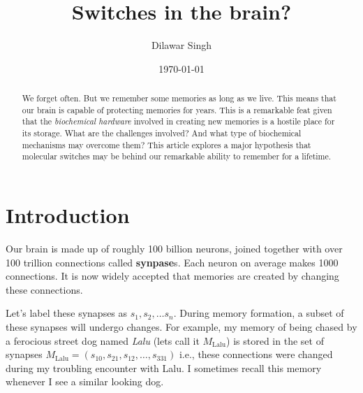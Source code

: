 \documentclass[]{resonance}
\title{Switches in the brain?}
\author{Dilawar Singh}
\date{\today}
\begin{document}
\maketitle


\begin{abstract}
    We forget often. But we remember some memories as long as we live.
    This means that our brain is capable of protecting memories for years.
    This is a remarkable feat given that the \emph{biochemical hardware}
    involved in creating new memories is a hostile place for
    its storage.  What are the challenges involved? And what type of 
    biochemical mechanisms may overcome them? This article explores a major
    hypothesis that molecular switches may be behind our remarkable ability to
    remember for a lifetime.
\end{abstract}

\maketitle
{}

\section{Introduction}\label{sec:intro}

Our brain is made up of roughly 100 billion neurons, joined together with over
100 trillion connections called \textbf{synpase}s. Each neuron on average makes
1000 connections. It is now widely accepted that memories are created by
changing these connections. 

Let's label these synapses as $s_1, s_2, \ldots s_n$. During memory formation, a
subset of these synapses will undergo changes. For example, my memory of being
chased by a ferocious street dog named \emph{Lalu} (lets call it
$M_\text{Lalu}$) is stored in the set of synapses $M_\text{Lalu}=(s_{10},
s_{21}, s_{12},\ldots,s_{331})$ i.e., these connections were changed during my
troubling encounter with Lalu. I sometimes recall this memory whenever I see a
similar looking dog.
\end{document}
